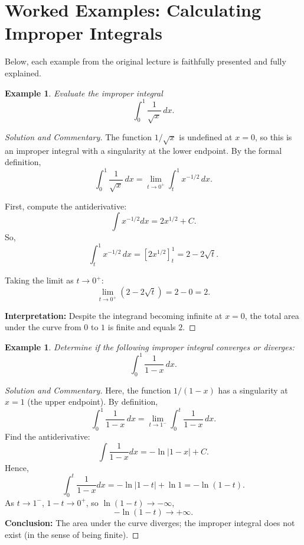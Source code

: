 \documentclass[12pt]{article}
\newtheorem{example}[definition]{Example}
\begin{document}
\section{Worked Examples: Calculating Improper Integrals}

Below, each example from the original lecture is faithfully presented and fully explained.

\begin{example}
Evaluate the improper integral
\[
\int_0^1 \frac{1}{\sqrt{x}}\,dx.
\]
\end{example}
\begin{proof}[Solution and Commentary]
The function $1/\sqrt{x}$ is undefined at $x=0$, so this is an improper integral with a singularity at the lower endpoint. By the formal definition,
\[
\int_0^1 \frac{1}{\sqrt{x}}\,dx = \lim_{t\to 0^+} \int_t^1 x^{-1/2}\,dx.
\]

First, compute the antiderivative:
\[
\int x^{-1/2} dx = 2x^{1/2} + C.
\]
So,
\[
\int_t^1 x^{-1/2}\,dx = \left[2x^{1/2}\right]_t^1 = 2 - 2\sqrt{t}.
\]

Taking the limit as $t \to 0^+$:
\[
\lim_{t\to 0^+} \left(2 - 2\sqrt{t}\right) = 2 - 0 = 2.
\]

\textbf{Interpretation:} Despite the integrand becoming infinite at $x=0$, the total area under the curve from $0$ to $1$ is finite and equals $2$.
\end{proof}

\begin{example}
Determine if the following improper integral converges or diverges:
\[
\int_0^1 \frac{1}{1 - x}\,dx.
\]
\end{example}
\begin{proof}[Solution and Commentary]
Here, the function $1/(1-x)$ has a singularity at $x=1$ (the upper endpoint). By definition,
\[
\int_0^1 \frac{1}{1-x}\,dx = \lim_{t\to 1^-} \int_0^t \frac{1}{1-x}\,dx.
\]
Find the antiderivative:
\[
\int \frac{1}{1-x} dx = -\ln|1 - x| + C.
\]
Hence,
\[
\int_0^t \frac{1}{1-x} dx = -\ln|1-t| + \ln 1 = -\ln(1-t).
\]
As $t \to 1^-$, $1-t \to 0^+$, so $\ln(1-t) \to -\infty$,
\[
-\ln(1-t) \to +\infty.
\]
\textbf{Conclusion:} The area under the curve diverges; the improper integral does not exist (in the sense of being finite).
\end{proof}
\end{document}
